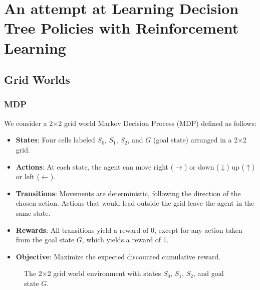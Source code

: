 \chapter{An attempt at Learning Decision Tree Policies with Reinforcement Learning}
\section{Grid Worlds}
\subsection{MDP}
We consider a 2×2 grid world Markov Decision Process (MDP) defined as follows:
\begin{itemize}
    \item \textbf{States}: Four cells labeled $S_0$, $S_1$, $S_2$, and $G$ (goal state) arranged in a 2×2 grid.
    \item \textbf{Actions}: At each state, the agent can move right ($\rightarrow$) or down ($\downarrow$) up ($\uparrow$) or left ($\leftarrow$).
    \item \textbf{Transitions}: Movements are deterministic, following the direction of the chosen action. Actions that would lead outside the grid leave the agent in the same state.
    \item \textbf{Rewards}: All transitions yield a reward of 0, except for any action taken from the goal state $G$, which yields a reward of 1.
    \item \textbf{Objective}: Maximize the expected discounted cumulative reward.
\end{itemize}

\begin{figure}[ht]
\centering
{}
\caption{The 2×2 grid world environment with states $S_0$, $S_1$, $S_2$, and goal state $G$.}\label{fig:grid-world}
\end{figure}


